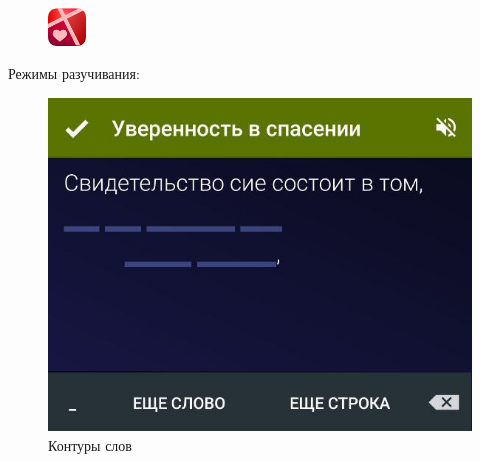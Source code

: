 \documentclass[t,aspectratio=169]{beamer}  %
\begin{document}
\begin{frame}[c]
\begin{multicols}{2}
	 \end{multicols}
\end{frame}
\begin{frame}[c]
	\frametitle{\insertsection}
	\framesubtitle{\insertsubsection}
	\begin{figure}
		\begin{flushright}
		\vspace{-1.5cm}
		\includegraphics[width=1cm]{remember-me-logo}
	\end{flushright}
		\end{figure}
		\vspace{0.4cm}
	Режимы разучивания:
	 \begin{multicols}{2}
		\begin{center}
			\begin{figure}
			\includegraphics[height=0.55\textheight]{remember-me-card-hide-underscores}
			\caption{Контуры слов}
			\end{figure}
			\begin{figure}

\end{figure}
\end{center}
\end{multicols}
\end{frame}
\end{document}
